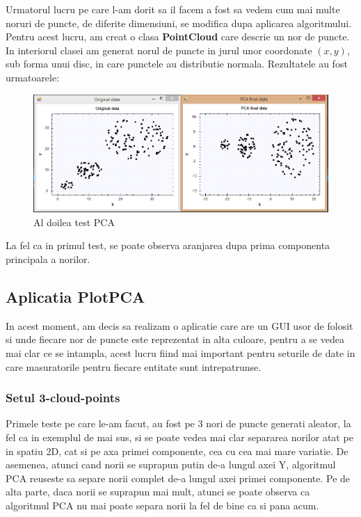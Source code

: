 \documentclass[12pt,oneside]{article}
\begin{document}
Urmatorul lucru pe care l-am dorit sa il facem a fost sa vedem cum mai multe noruri de puncte, de diferite dimensiuni, se modifica dupa aplicarea algoritmului. Pentru acest lucru, am creat o clasa \textbf{PointCloud} care descrie un nor de puncte. In interiorul clasei am generat norul de puncte in jurul unor coordonate $\left(x,y\right)$, sub forma unui disc, in care punctele au distributie normala. Rezultatele au fost urmatoarele:

\begin{figure}[H]
\centering
\caption{Al doilea test PCA}
\includegraphics[width=\linewidth]{Test2}
\end{figure}

La fel ca in primul test, se poate observa aranjarea dupa prima componenta principala a norilor.


\subsection{Aplicatia PlotPCA}
In acest moment, am decis sa realizam o aplicatie care are un GUI usor de folosit si unde fiecare nor de puncte este reprezentat in alta culoare, pentru a se vedea mai clar ce se intampla, acest lucru fiind mai important pentru seturile de date in care masuratorile pentru fiecare entitate sunt intrepatrunse.

\subsubsection{Setul 3-cloud-points}
Primele teste pe care le-am facut, au fost pe 3 nori de puncte generati aleator, la fel ca in exemplul de mai sus, si se poate vedea mai clar separarea norilor atat pe in spatiu 2D, cat si pe axa primei componente, cea cu cea mai mare variatie. De asemenea, atunci cand norii se suprapun putin de-a lungul axei Y, algoritmul PCA reuseste sa separe norii complet de-a lungul axei primei componente. Pe de alta parte, daca norii se suprapun mai mult, atunci se poate observa ca algoritmul PCA nu mai poate separa norii la fel de bine ca si pana acum.
\end{document}
